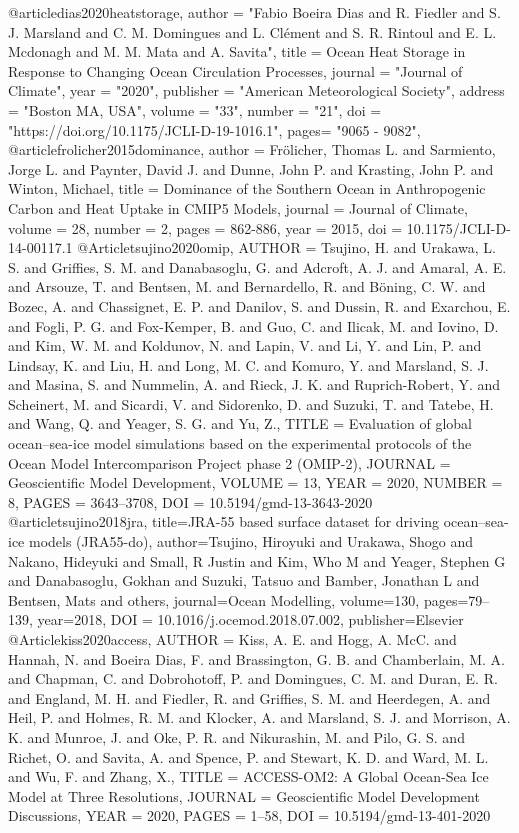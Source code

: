@article{dias2020heatstorage,
      author = "Fabio Boeira Dias and R. Fiedler and S. J. Marsland and C. M. Domingues and L. Clément and S. R. Rintoul and E. L. Mcdonagh and M. M. Mata and A. Savita",
      title = {{Ocean Heat Storage in Response to Changing Ocean Circulation Processes}},
      journal = "Journal of Climate",
      year = "2020",
      publisher = "American Meteorological Society",
      address = "Boston MA, USA",
      volume = "33",
      number = "21",
      doi = "https://doi.org/10.1175/JCLI-D-19-1016.1",
      pages=      "9065 - 9082",
}
@article{frolicher2015dominance,
 author = {Fr\"olicher, Thomas L. and Sarmiento, Jorge L. and Paynter, David J. and Dunne, John P. and Krasting, John P. and Winton, Michael},
 title = {{Dominance of the Southern Ocean in Anthropogenic Carbon and Heat Uptake in CMIP5 Models}},
 journal = {Journal of Climate},
 volume = {28},
 number = {2},
 pages = {862-886},
 year = {2015},
 doi = {10.1175/JCLI-D-14-00117.1}
}
@Article{tsujino2020omip,
 AUTHOR = {Tsujino, H. and Urakawa, L. S. and Griffies, S. M. and Danabasoglu, G. and Adcroft, A. J. and Amaral, A. E. and Arsouze, T. and Bentsen, M. and Bernardello, R. and B\"oning, C. W. and Bozec, A. and Chassignet, E. P. and Danilov, S. and Dussin, R. and Exarchou, E. and Fogli, P. G. and Fox-Kemper, B. and Guo, C. and Ilicak, M. and Iovino, D. and Kim, W. M. and Koldunov, N. and Lapin, V. and Li, Y. and Lin, P. and Lindsay, K. and Liu, H. and Long, M. C. and Komuro, Y. and Marsland, S. J. and Masina, S. and Nummelin, A. and Rieck, J. K. and Ruprich-Robert, Y. and Scheinert, M. and Sicardi, V. and Sidorenko, D. and Suzuki, T. and Tatebe, H. and Wang, Q. and Yeager, S. G. and Yu, Z.},
 TITLE = {{Evaluation of global ocean--sea-ice model simulations based on the
 experimental protocols of the Ocean Model Intercomparison Project phase 2
 (OMIP-2)}},
 JOURNAL = {Geoscientific Model Development},
 VOLUME = {13},
 YEAR = {2020},
 NUMBER = {8},
 PAGES = {3643--3708},
 DOI = {10.5194/gmd-13-3643-2020}
}
@article{tsujino2018jra,
 title={{JRA-55 based surface dataset for driving ocean--sea-ice models (JRA55-do)}},
 author={Tsujino, Hiroyuki and Urakawa, Shogo and Nakano, Hideyuki and Small, R Justin and Kim, Who M and Yeager, Stephen G and Danabasoglu, Gokhan and Suzuki, Tatsuo and Bamber, Jonathan L and Bentsen, Mats and others},
 journal={Ocean Modelling},
 volume={130},
 pages={79--139},
 year={2018},
 DOI = {10.1016/j.ocemod.2018.07.002},
 publisher={Elsevier}
}
@Article{kiss2020access,
 AUTHOR = {Kiss, A. E. and Hogg, A. McC. and Hannah, N. and Boeira Dias, F. and Brassington, G. B. and Chamberlain, M. A. and Chapman, C. and Dobrohotoff, P. and Domingues, C. M. and Duran, E. R. and England, M. H. and Fiedler, R. and Griffies, S. M. and Heerdegen, A. and Heil, P. and Holmes, R. M. and Klocker, A. and Marsland, S. J. and Morrison, A. K. and Munroe, J. and Oke, P. R. and Nikurashin, M. and Pilo, G. S. and Richet, O. and Savita, A. and Spence, P. and Stewart, K. D. and Ward, M. L. and Wu, F. and Zhang, X.},
 TITLE = {{ACCESS-OM2: A Global Ocean-Sea Ice Model at Three Resolutions}},
 JOURNAL = {Geoscientific Model Development Discussions},
 YEAR = {2020},
 PAGES = {1--58},
 DOI = {10.5194/gmd-13-401-2020}
}
